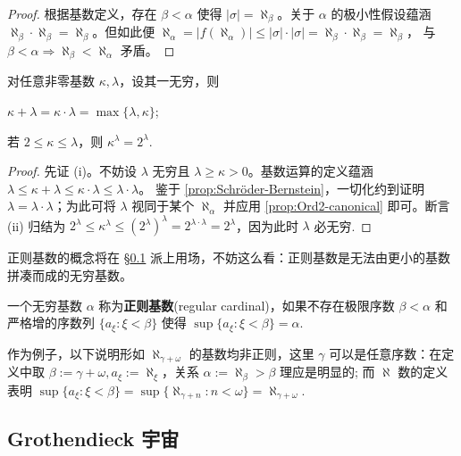 \begin{proof}
	根据基数定义，存在 $\beta < \alpha$ 使得 $|\sigma| = \aleph_\beta$。关于 $\alpha$ 的极小性假设蕴涵 $\aleph_\beta \cdot \aleph_\beta = \aleph_\beta$。但如此便 $\aleph_\alpha = |f(\aleph_\alpha)| \leqslant |\sigma| \cdot |\sigma| = \aleph_\beta \cdot \aleph_\beta = \aleph_\beta$，
	与 $\beta < \alpha \Rightarrow \aleph_\beta < \aleph_\alpha$ 矛盾。
\end{proof}

\begin{corollary}
	对任意非零基数 $\kappa,\lambda$，设其一无穷，则
	\begin{inparaenum}[(i)]
		\item $\kappa + \lambda = \kappa \cdot \lambda = \max\{\lambda,\kappa\}$;
		\item 若 $2 \leqslant \kappa \leqslant \lambda$，则 $\kappa^\lambda = 2^\lambda$.
	\end{inparaenum}
\end{corollary}
\begin{proof}
	先证 (i)。不妨设 $\lambda$ 无穷且 $\lambda \geqslant \kappa > 0$。基数运算的定义蕴涵 $\lambda \leqslant \kappa + \lambda \leqslant \kappa \cdot \lambda \leqslant \lambda \cdot \lambda$。
	鉴于 \ref{prop:Schröder-Bernstein}，一切化约到证明 $\lambda = \lambda \cdot \lambda$；为此可将 $\lambda$ 视同于某个 $\aleph_\alpha$ 并应用 \ref{prop:Ord2-canonical} 即可。断言 (ii) 归结为 $2^\lambda \leqslant \kappa^\lambda \leqslant (2^{\lambda})^\lambda = 2^{\lambda \cdot \lambda} = 2^\lambda$，因为此时 $\lambda$ 必无穷.
\end{proof}

正则基数的概念将在 \S\ref{sec:Grot-universe} 派上用场，不妨这么看：正则基数是无法由更小的基数拼凑而成的无穷基数。
\begin{definition}\label{def:regular-cardinal}
	一个无穷基数 $\alpha$ 称为\textbf{正则基数}(regular cardinal)，如果不存在极限序数 $\beta < \alpha$ 和严格增的序数列 $\{ a_\xi : \xi < \beta \}$ 使得 $\sup \{a_\xi : \xi < \beta\} = \alpha$.
\end{definition}

作为例子，以下说明形如 $\aleph_{\gamma+\omega}$ 的基数均非正则，这里 $\gamma$ 可以是任意序数：在定义中取 $\beta := \gamma + \omega, a_\xi := \aleph_\xi$，关系 $\alpha := \aleph_\beta > \beta$ 理应是明显的; 而 $\aleph$ 数的定义表明 $\sup \{ a_\xi : \xi < \beta \} = \sup \{ \aleph_{\gamma + n} : n < \omega \} = \aleph_{\gamma+\omega}$.

\subsection{Grothendieck 宇宙}\label{sec:Grot-universe}

